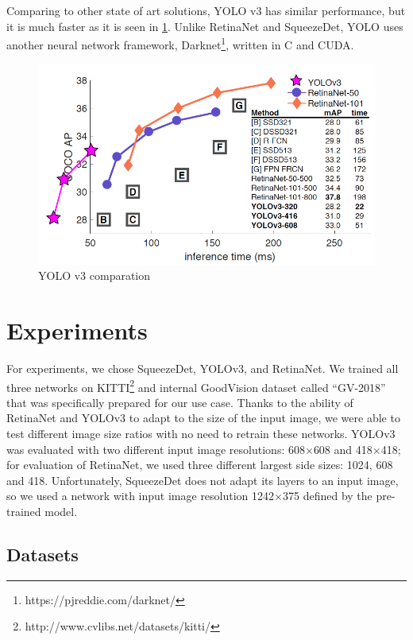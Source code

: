 \documentclass[twoside]{ctuthesis}
\theoremstyle{plain}
\theoremstyle{definition}
\theoremstyle{note}
\begin{document}
Comparing to other state of art solutions, YOLO v3 has similar performance, but it is much faster as it is seen in \ref{yolov3-compare}.
Unlike RetinaNet and SqueezeDet, YOLO uses another neural network framework, Darknet\footnote{https://pjreddie.com/darknet/}, written in C and CUDA. 
\begin{figure}[H]
\caption{YOLO v3 comparation\cite{Redmon2018YOLOv3AI}}
\label{yolov3-compare}
\includegraphics[width=\textwidth]{images/used_networks/yolov3_comparasion.png}
\end{figure}
\chapter{Experiments}
For experiments, we chose SqueezeDet, YOLOv3, and RetinaNet. We trained all three networks on KITTI\footnote{http://www.cvlibs.net/datasets/kitti/} and internal GoodVision dataset called ``GV-2018'' that was specifically prepared for our use case. Thanks to the ability of RetinaNet and YOLOv3 to adapt to the size of the input image, we were able to test different image size ratios with no need to retrain these networks.  YOLOv3 was evaluated with two different input image resolutions: 608$\times$608 and 418$\times$418; for evaluation of RetinaNet, we used three different largest side sizes: 1024, 608 and 418. Unfortunately, SqueezeDet does not adapt its layers to an input image, so we used a network with input image resolution 1242$\times$375 defined by the pre-trained model.
\section{Datasets}
\end{document}
